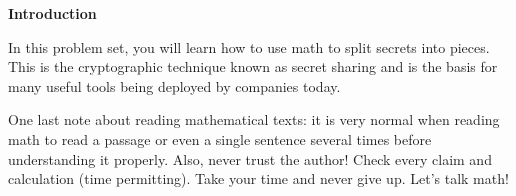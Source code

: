 \begin{center} \textbf{Introduction} \end{center}

\indent In this problem set, you will learn how to use math to split secrets into pieces. This is the cryptographic technique known as secret sharing and is the basis for many useful tools being deployed by companies today.

One last note about reading mathematical texts: it is very normal when reading math to read a passage or even a single sentence several times before understanding it properly. Also, never trust the author! Check every claim and calculation (time permitting). Take your time and never give up. Let's talk math!